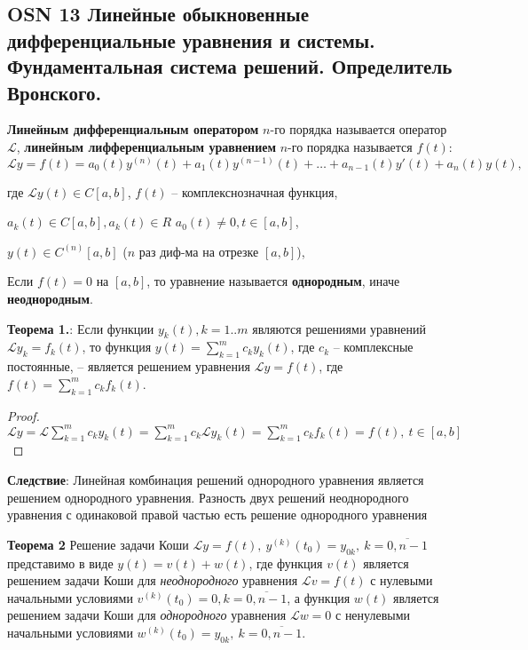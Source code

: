 \subsection{OSN 13 Линейные обыкновенные дифференциальные уравнения и системы. Фундаментальная система решений. Определитель Вронского.}



\textbf{Линейным дифференциальным оператором} $n$-го порядка называется оператор $\mathcal{L}$, \textbf{линейным лифференциальным уравнением}  $n$-го порядка называется $f(t)$:
$$\mathcal{L} y = f(t) = a_0(t)y^{(n)}(t) + a_1(t)y^{(n-1)}(t) +\dots + a_{n-1}(t)y'(t) + a_n(t)y(t),$$

где $\mathcal{L}y(t) \in C[a, b]$, $f(t)$ -- комплекснозначная функция, 

$a_k(t) \in C[a,b], a_k(t) \in R$ $a_0(t) \neq 0, t \in [a,b]$,

$y(t) \in C^{(n)}[a,b]$ ($n$ раз диф-ма на отрезке $[a,b]$), 


Если $f(t) = 0$ на $[a, b]$, то уравнение называется \textbf{однородным}, иначе \textbf{неоднородным}.

\textbf{Теорема 1.}:
Если функции $y_k(t), k=1..m$ являются решениями уравнений $\mathcal{L} y_k = f_k(t)$, то функция $y(t) = \sum_{k=1}^m c_k y_k(t)$, где $c_k$ -- комплексные постоянные, -- является решением уравнения  $\mathcal{L} y = f(t)$, где $f(t) =  \sum_{k=1}^m c_k f_k(t)$.

\begin{proof}
$\mathcal{L} y = \mathcal{L} \sum_{k=1}^m c_k y_k(t) = \sum_{k=1}^m c_k \mathcal{L} y_k(t) = \sum_{k=1}^m c_k f_k(t) = f(t), \ t \in [a,b]$
\end{proof}

\textbf{Следствие}: Линейная комбинация решений однородного уравнения является решением однородного уравнения. Разность двух решений неоднородного уравнения с одинаковой правой частью есть решение однородного уравнения

\textbf{Теорема 2} Решение задачи Коши $\mathcal{L}y = f(t),~y^{(k)}(t_0) = y_{0k},~k = \overline{0, n - 1}$ представимо в виде $y(t) = v(t) + w(t)$, где функция $v(t)$ является решением задачи Коши для \textit{неоднородного} уравнения $\mathcal{L}v = f(t)$ с нулевыми начальными условиями $v^{(k)}(t_0) = 0, k = \overline{0, n - 1}$, а функция $w(t)$ является решением задачи Коши для \textit{однородного} уравнения $\mathcal{L}w = 0$ с ненулевыми начальными условиями $w^{(k)}(t_0) = y_{0k},~k = \overline{0, n - 1}$.

